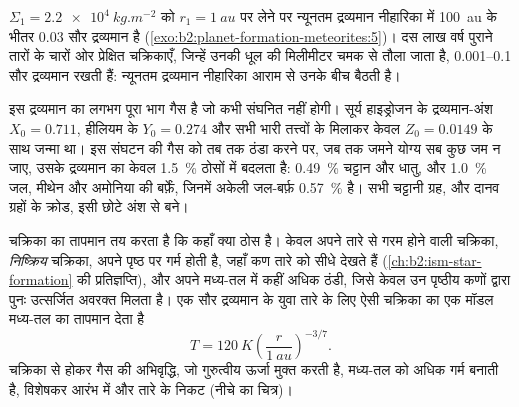 $\Sigma_1 = \qty{2.2e4}{kg.m^{-2}}$ को $r_1 = \qty{1}{au}$ पर लेने पर न्यूनतम द्रव्यमान
नीहारिका में \qty{100}{au} के भीतर $0.03$ सौर द्रव्यमान है (\cref{exo:b2:planet-formation-meteorites:5})। दस लाख वर्ष
पुराने तारों के चारों ओर प्रेक्षित चक्रिकाएँ, जिन्हें उनकी धूल की मिलीमीटर चमक से तौला जाता है,
\numrange{0.001}{0.1} सौर द्रव्यमान रखती हैं: न्यूनतम द्रव्यमान नीहारिका
आराम से उनके बीच बैठती है।

इस द्रव्यमान का लगभग पूरा भाग गैस है जो कभी संघनित नहीं होगी। सूर्य
हाइड्रोजन के द्रव्यमान-अंश $X_0 = 0.711$, हीलियम के $Y_0 = 0.274$ और
सभी भारी तत्त्वों के मिलाकर केवल $Z_0 = 0.0149$ के साथ जन्मा था। इस
संघटन की गैस को तब तक ठंडा करने पर, जब तक जमने योग्य सब कुछ जम न जाए, उसके द्रव्यमान का
केवल \qty{1.5}{\percent} ठोसों में बदलता है: \qty{0.49}{\percent} चट्टान और
धातु, और \qty{1.0}{\percent} जल, मीथेन और अमोनिया की बर्फ़ें, जिनमें अकेली जल-बर्फ़
\qty{0.57}{\percent} है। सभी चट्टानी ग्रह, और दानव ग्रहों के
क्रोड, इसी छोटे अंश से बने।

चक्रिका का तापमान तय करता है कि कहाँ क्या ठोस है। केवल अपने तारे से गरम होने वाली चक्रिका,
\emph{निष्क्रिय} चक्रिका, अपने पृष्ठ पर गर्म होती है, जहाँ कण
तारे को सीधे देखते हैं (\cref{ch:b2:ism-star-formation} की प्रतिज्ञप्ति), और
अपने मध्य-तल में कहीं अधिक ठंडी, जिसे केवल उन पृष्ठीय कणों द्वारा पुनः उत्सर्जित अवरक्त
मिलता है। एक सौर द्रव्यमान के युवा तारे के लिए ऐसी चक्रिका का एक मॉडल
मध्य-तल का तापमान देता है
\[
  T = \qty{120}{K}\left(\frac{r}{\qty{1}{au}}\right)^{-3/7}.
\]
चक्रिका से होकर गैस की अभिवृद्धि, जो गुरुत्वीय ऊर्जा मुक्त करती है, मध्य-तल को
अधिक गर्म बनाती है, विशेषकर आरंभ में और तारे के निकट (नीचे का चित्र)।

